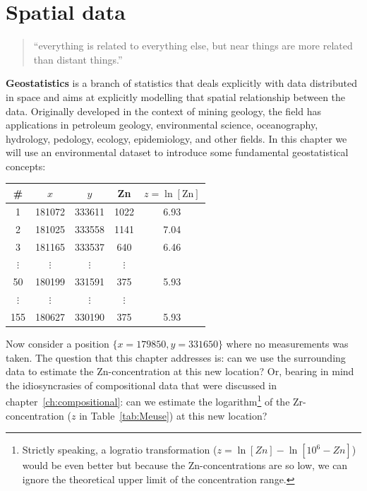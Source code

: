 \chapter{Spatial data}
\label{ch:spatial}

\begin{quote}
``everything is related to everything else, but near things are more
  related than distant things.''  
\end{quote}

\textbf{Geostatistics} is a branch of statistics that deals explicitly
with data distributed in space and aims at explicitly modelling that
spatial relationship between the data. Originally developed in the
context of mining geology, the field has applications in petroleum
geology, environmental science, oceanography, hydrology, pedology,
ecology, epidemiology, and other fields. In this chapter we will use
an environmental dataset to introduce some fundamental geostatistical
concepts:

\begin{center}
\begin{tabular}{c|cccc}
\#  & $x$    & $y$    & Zn & $z=\ln[\mbox{Zn}]$\\ \hline
1   & 181072 & 333611 & 1022 & 6.93 \\     
2   & 181025 & 333558 & 1141 & 7.04 \\
3   & 181165 & 333537 & 640  & 6.46 \\
$\vdots$ & $\vdots$ & $\vdots$ & $\vdots$ \\
50  & 180199 & 331591 & 375  & 5.93 \\
$\vdots$ & $\vdots$ & $\vdots$ & $\vdots$ \\
155 & 180627 & 330190 & 375  & 5.93 \\
\end{tabular}
\label{tab:Meuse}
\end{center}

Now consider a position $\{x=179850,y=331650\}$ where no measurements
was taken. The question that this chapter addresses is: can we use the
surrounding data to estimate the Zn-concentration at this new
location? Or, bearing in mind the idiosyncrasies of compositional data
that were discussed in chapter~\ref{ch:compositional}: can we estimate
the logarithm\footnote{Strictly speaking, a logratio transformation
($z = \ln[Zn] - \ln[10^6 - Zn]$) would be even better but because the
Zn-concentrations are so low, we can ignore the theoretical upper
limit of the concentration range.} of the Zr-concentration ($z$ in
Table~\ref{tab:Meuse}) at this new location?

